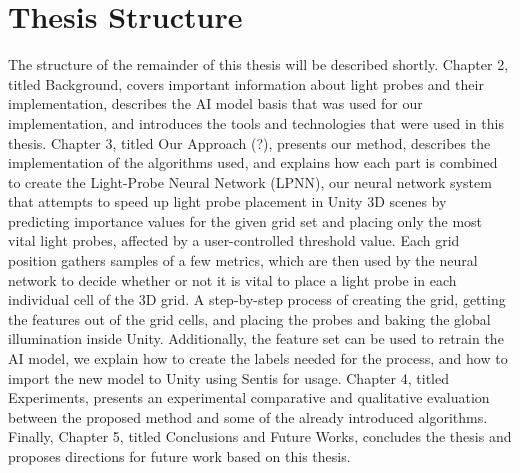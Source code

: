 \section{Thesis Structure} %
The structure of the remainder of this thesis will be described shortly. Chapter 2, titled Background, covers important information about light probes and their implementation, describes the AI model basis that was used for our implementation, and introduces the tools and technologies that were used in this thesis. Chapter 3, titled Our Approach (?), presents our method, describes the implementation of the algorithms used, and explains how each part is combined to create the Light-Probe Neural Network (LPNN), our neural network system that attempts to speed up light probe placement in Unity 3D scenes by predicting importance values for the given grid set and placing only the most vital light probes, affected by a user-controlled threshold value. Each grid position gathers samples of a few metrics, which are then used by the neural network to decide whether or not it is vital to place a light probe in each individual cell of the 3D grid. A step-by-step process of creating the grid, getting the features out of the grid cells, and placing the probes and baking the global illumination inside Unity. Additionally, the feature set can be used to retrain the AI model, we explain how to create the labels needed for the process, and how to import the new model to Unity using Sentis for usage. Chapter 4, titled Experiments, presents an experimental comparative and qualitative evaluation between the proposed method and some of the already introduced algorithms. Finally, Chapter 5, titled Conclusions and Future Works, concludes the thesis and proposes directions for future work based on this thesis.













